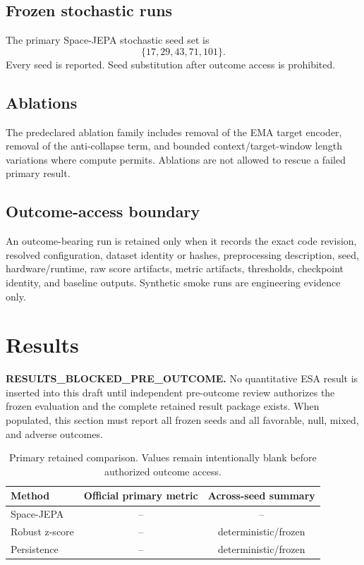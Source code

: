 \documentclass[conference]{IEEEtran}
\begin{document}
\subsection{Frozen stochastic runs}
The primary Space-JEPA stochastic seed set is
\begin{equation}
\{17, 29, 43, 71, 101\}.
\end{equation}
Every seed is reported. Seed substitution after outcome access is prohibited.

\subsection{Ablations}
The predeclared ablation family includes removal of the EMA target encoder, removal of the anti-collapse term, and bounded context/target-window length variations where compute permits. Ablations are not allowed to rescue a failed primary result.

\subsection{Outcome-access boundary}
An outcome-bearing run is retained only when it records the exact code revision, resolved configuration, dataset identity or hashes, preprocessing description, seed, hardware/runtime, raw score artifacts, metric artifacts, thresholds, checkpoint identity, and baseline outputs. Synthetic smoke runs are engineering evidence only.

\section{Results}
\textbf{RESULTS\_BLOCKED\_PRE\_OUTCOME.} No quantitative ESA result is inserted into this draft until independent pre-outcome review authorizes the frozen evaluation and the complete retained result package exists. When populated, this section must report all frozen seeds and all favorable, null, mixed, and adverse outcomes.

\begin{table}[t]
\centering
\caption{Primary retained comparison. Values remain intentionally blank before authorized outcome access.}
\begin{tabular}{lcc}
\toprule
Method & Official primary metric & Across-seed summary \\
\midrule
Space-JEPA & -- & -- \\
Robust z-score & -- & deterministic/frozen \\
Persistence & -- & deterministic/frozen \\
\bottomrule
\end{tabular}
\end{table}
\end{document}
